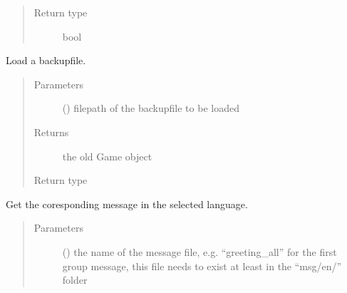 \documentclass[letterpaper,10pt,english]{sphinxmanual}
\begin{document}
\begin{fulllineitems}
\begin{fulllineitems}
\begin{quote}
\begin{description}
\begin{description}
\end{description}


\item[{Return type}] \leavevmode
bool

\end{description}\end{quote}

\end{fulllineitems}


\begin{fulllineitems}
\label{\detokenize{chatwolf:chatwolf.game.Game.load_bkp}}
Load a backup\sphinxhyphen{}file.
\begin{quote}\begin{description}
\item[{Parameters}] \leavevmode
{} () \textendash{} filepath of the backup\sphinxhyphen{}file to be loaded

\item[{Returns}] \leavevmode
the old Game object

\item[{Return type}] \leavevmode
{\hyperref[\detokenize{chatwolf:chatwolf.game.Game}]{}}

\end{description}\end{quote}

\end{fulllineitems}


\begin{fulllineitems}
\label{\detokenize{chatwolf:chatwolf.game.Game.msg}}
Get the coresponding message in the selected language.
\begin{quote}\begin{description}
\item[{Parameters}] \leavevmode
{} () \textendash{} the name of the message file,
e.g. “greeting\_all” for the first group message,
this file needs to exist at least in the “msg/en/” folder


\end{description}
\end{quote}
\end{fulllineitems}
\end{fulllineitems}
\end{document}

